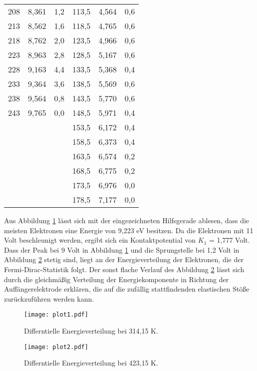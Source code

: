 \begin{table}
\begin{tabular}{c c c | c c c}
    208 & 8,361  & 1,2 & 113,5 & 4,564 & 0,6 \\
    213 & 8,562  & 1,6 & 118,5 & 4,765 & 0,6 \\
    218 & 8,762  & 2,0 & 123,5 & 4,966 & 0,6 \\
    223 & 8,963  & 2,8 & 128,5 & 5,167 & 0,6 \\
    228 & 9,163  & 4,4 & 133,5 & 5,368 & 0,4 \\
    233 & 9,364  & 3,6 & 138,5 & 5,569 & 0,6 \\
    238 & 9,564  & 0,8 & 143,5 & 5,770 & 0,6 \\
    243 & 9,765  & 0,0 & 148,5 & 5,971 & 0,4 \\
        &        &     & 153,5 & 6,172 & 0,4 \\
        &        &     & 158,5 & 6,373 & 0,4 \\
        &        &     & 163,5 & 6,574 & 0,2 \\
        &        &     & 168,5 & 6,775 & 0,2 \\
        &        &     & 173,5 & 6,976 & 0,0 \\
        &        &     & 178,5 & 7,177 & 0,0 \\

    \bottomrule
  \end{tabular}
\end{table}
Aus Abbildung \ref{fig:plot1} lässt sich mit der eingezeichneten Hilfsgerade ablesen, dass die meisten Elektronen eine Energie von 9,223 eV besitzen.
Da die Elektronen mit 11 Volt beschleunigt werden, ergibt sich ein Kontaktpotential von $K_1$ = 1,777 Volt.
Dass der Peak bei 9 Volt in Abbildung \ref{fig:plot1} und die Sprungstelle bei 1,2 Volt in Abbildung \ref{fig:plot2} stetig sind, liegt an der Energieverteilung der Elektronen, die der Fermi-Dirac-Statistik folgt.
Der sonst flache Verlauf des Abbildung \ref{fig:plot2} lässt sich durch die gleichmäßig Verteilung der Energiekomponente in Richtung der Auffängerelektrode erklären, die auf die zufällig stattfindenden elastischen Stöße zurückzuführen werden kann.
\begin{figure}
  \centering
  \texttt{[image: plot1.pdf]}
  \caption{Differntielle Energieverteilung bei 314,15 K.}
  \label{fig:plot1}
\end{figure}
\begin{figure}
  \centering
  \texttt{[image: plot2.pdf]}
  \caption{Differntielle Energieverteilung bei 423,15 K.}
  \label{fig:plot2}
\end{figure}
\FloatBarrier

